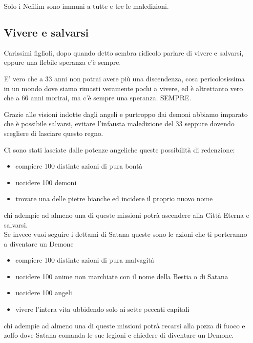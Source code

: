 \documentclass[12pt,a4paper,twoside,openany]{book}
\begin{document}
\begin{multicols}{2}
Solo i Nefilim sono immuni a tutte e tre le maledizioni.

\subsection{Vivere e salvarsi}

Carissimi figlioli, dopo quando detto sembra ridicolo parlare di vivere e salvarsi, eppure una flebile speranza c'è sempre.

E' vero che a 33 anni non potrai avere più una discendenza, cosa pericolosissima in un mondo dove siamo rimasti veramente pochi a vivere, ed è altrettanto vero che a 66 anni morirai, ma c'è sempre una speranza. SEMPRE.

Grazie alle visioni indotte dagli angeli e purtroppo dai demoni abbiamo imparato che è possibile salvarsi, evitare l'infausta maledizione del 33 seppure dovendo scegliere di lasciare questo regno.

Ci sono stati lasciate dalle potenze angeliche queste possibilità di redenzione:

\begin{itemize}

\item compiere 100 distinte azioni di pura bontà
\item uccidere 100 demoni
\item trovare una delle pietre bianche ed incidere il proprio nuovo nome

\end{itemize}

chi adempie ad almeno una di queste missioni potrà ascendere alla Città Eterna e salvarsi.\\

Se invece vuoi seguire i dettami di Satana queste sono le azioni che ti porteranno a diventare un Demone

\begin{itemize}

\item compiere 100 distinte azioni di pura malvagità
\item uccidere 100 anime non marchiate con il nome della Bestia o di Satana
\item uccidere 100 angeli
\item vivere l'intera vita ubbidendo solo ai sette peccati capitali

\end{itemize}

chi adempie ad almeno una di queste missioni potrà recarsi alla pozza di fuoco e zolfo dove Satana comanda le sue legioni e chiedere di diventare un Demone.


\end{multicols}
\end{document}
